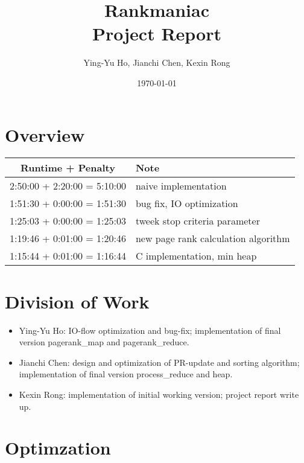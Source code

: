 \documentclass[12pt]{article}
\newcommand{\course}[2]{\def\courseName{#1} \def\sectName{#2}}
\newcommand{\assn}[1]{\def\assnName{#1}}
\begin{document}
\course{Rankmaniac}{}
\assn{Project Report}
\date{\today}
\title{\courseName \sectName \\ \assnName}
\author{Ying-Yu Ho, Jianchi Chen, Kexin Rong}
\maketitle

\thispagestyle{empty}

\section{Overview}
\begin{center}
    \begin{tabular}{ | c | l | }
    \hline
    \textbf{Runtime + Penalty} & \textbf{Note} \\ \hline
    2:50:00 + 2:20:00 = 5:10:00 & naive implementation \\ 
    1:51:30  +  0:00:00  =  1:51:30 & bug fix, IO optimization \\
    1:25:03  +  0:00:00  =  1:25:03 & tweek stop criteria parameter \\
    1:19:46  +  0:01:00  =  1:20:46 & new page rank calculation algorithm\\
    1:15:44  +  0:01:00  =  1:16:44 & C implementation, min heap\\
    \hline
    \end{tabular}
\end{center}


\section{Division of Work}
\begin{itemize}
\item Ying-Yu Ho: IO-flow optimization and bug-fix; implementation of final version pagerank\_map and pagerank\_reduce.
\item Jianchi Chen: design and optimization of PR-update and sorting algorithm; implementation of final version process\_reduce and heap.
\item Kexin Rong: implementation of initial working version; project report write up. 
\end{itemize}

\section{Optimzation}
\end{document}
